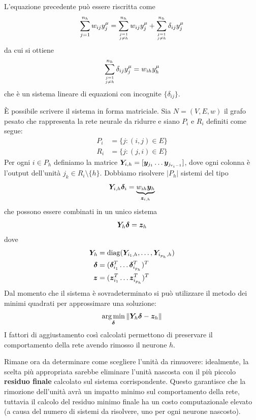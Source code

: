 L'equazione precedente può essere riscritta come
\begin{displaymath}
	\sum_{j = 1}^{n_h}  w_{ij} y^\mu_j = 
	\sum_{j = 1 \atop j \neq h} ^ {n_h} w_{ij} y^\mu_j + 
	\sum_{j = 1 \atop j \neq h} ^ {n_h} \delta_{ij} y^\mu_j
\end{displaymath}
da cui si ottiene
\begin{displaymath}
	\sum_{j = 1 \atop j \neq h} ^ {n_h} \delta_{ij} y^\mu_j =
	w_{ih} y^\mu_h
\end{displaymath}
che è un sistema lineare di equazioni con incognite $\{\delta_{ij}\}$.

È possibile scrivere il sistema in forma matriciale. Sia $N = (V, E, w)$ il grafo pesato che rappresenta la rete neurale da ridurre e siano $P_i$ e $R_i$ definiti come segue:
\begin{align*}
	P_i &= \{j : (i, j) \in E\} \\
	R_i &= \{j : (j, i) \in E\}
\end{align*}
Per ogni $i \in P_h$ definiamo la matrice $\mat{Y}_{i, h} = [\vec{y}_{j_1} \dots \vec{y}_{j_{r_i - 1}}]$, dove ogni colonna è l'output dell'unità $j_k \in R_i \setminus \{h\}$. Dobbiamo risolvere $|P_h|$ sistemi del tipo
\begin{displaymath}
	\mat{Y}_{i, h} \vec{\delta}_i = \underbrace{w_{ih} \vec{y}_h}_{\vec{z}_{i, h}}
\end{displaymath}
che possono essere combinati in un unico sistema
\begin{displaymath}
	\mat{Y}_h \vec{\delta} = \vec{z}_h
\end{displaymath}
dove
\begin{align*}
	\mat{Y}_h &= \diag(\mat{Y}_{i_1, h}, \dots, \mat{Y}_{i_{p_h}, h}) \\
	\vec{\delta} &= (\vec{\delta}_{i_1}^T \dots \vec{\delta}_{i_{p_h}}^T)^T \\
	\vec{z} &= (\vec{z}_{i_1}^T \dots \vec{z}_{i_{p_h}}^T)^T
\end{align*}
Dal momento che il sistema è sovradeterminato si può utilizzare il metodo dei minimi quadrati per approssimare una soluzione:
\begin{displaymath}
	\argmin_{\vec{\delta}} \|\mat{Y}_h \vec{\delta} - \vec{z}_h\|
\end{displaymath}
I fattori di aggiustamento così calcolati permettono di preservare il comportamento della rete avendo rimosso il neurone $h$.

Rimane ora da determinare come scegliere l'unità da rimuovere: idealmente, la scelta più appropriata sarebbe eliminare l'unità nascosta con il più piccolo \textbf{residuo finale} calcolato sul sistema corrispondente. Questo garantisce che la rimozione dell'unità avrà un impatto minimo sul comportamento della rete, tuttavia il calcolo del residuo minimo finale ha un costo computazionale elevato (a causa del numero di sistemi da risolvere, uno per ogni neurone nascosto).

